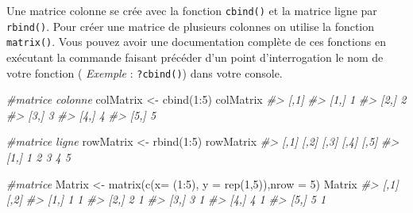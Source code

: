 \documentclass[
]{book}
\newenvironment{Shaded}{\begin{snugshade}}{\end{snugshade}}
\newcommand{\AttributeTok}[1]{\textcolor[rgb]{0.77,0.63,0.00}{#1}}
\newcommand{\CommentTok}[1]{\textcolor[rgb]{0.56,0.35,0.01}{\textit{#1}}}
\newcommand{\DecValTok}[1]{\textcolor[rgb]{0.00,0.00,0.81}{#1}}
\newcommand{\FunctionTok}[1]{\textcolor[rgb]{0.00,0.00,0.00}{#1}}
\newcommand{\NormalTok}[1]{#1}
\newcommand{\OtherTok}[1]{\textcolor[rgb]{0.56,0.35,0.01}{#1}}
\newcommand{\SpecialCharTok}[1]{\textcolor[rgb]{0.00,0.00,0.00}{#1}}
\begin{document}
Une matrice colonne se crée avec la fonction \texttt{cbind()} et la matrice ligne par \texttt{rbind()}. Pour créer une matrice de plusieurs colonnes on utilise la fonction \texttt{matrix()}.
Vous pouvez avoir une documentation complète de ces fonctions en exécutant la commande faisant précéder d'un point d'interrogation le nom de votre fonction ( \emph{Exemple} : \texttt{?cbind()}) dans votre console.

\begin{Shaded}
\begin{Highlighting}[]
\CommentTok{\#matrice colonne}
\NormalTok{colMatrix }\OtherTok{\textless{}{-}} \FunctionTok{cbind}\NormalTok{(}\DecValTok{1}\SpecialCharTok{:}\DecValTok{5}\NormalTok{)}
\NormalTok{colMatrix}
\CommentTok{\#\textgreater{}      [,1]}
\CommentTok{\#\textgreater{} [1,]    1}
\CommentTok{\#\textgreater{} [2,]    2}
\CommentTok{\#\textgreater{} [3,]    3}
\CommentTok{\#\textgreater{} [4,]    4}
\CommentTok{\#\textgreater{} [5,]    5}
\end{Highlighting}
\end{Shaded}

\begin{Shaded}
\begin{Highlighting}[]
\CommentTok{\#matrice ligne}
\NormalTok{rowMatrix }\OtherTok{\textless{}{-}} \FunctionTok{rbind}\NormalTok{(}\DecValTok{1}\SpecialCharTok{:}\DecValTok{5}\NormalTok{)}
\NormalTok{rowMatrix}
\CommentTok{\#\textgreater{}      [,1] [,2] [,3] [,4] [,5]}
\CommentTok{\#\textgreater{} [1,]    1    2    3    4    5}
\end{Highlighting}
\end{Shaded}

\begin{Shaded}
\begin{Highlighting}[]
\CommentTok{\#matrice}
\NormalTok{Matrix }\OtherTok{\textless{}{-}} \FunctionTok{matrix}\NormalTok{(}\FunctionTok{c}\NormalTok{(}\AttributeTok{x=}\NormalTok{ (}\DecValTok{1}\SpecialCharTok{:}\DecValTok{5}\NormalTok{), }\AttributeTok{y =} \FunctionTok{rep}\NormalTok{(}\DecValTok{1}\NormalTok{,}\DecValTok{5}\NormalTok{)),}\AttributeTok{nrow =} \DecValTok{5}\NormalTok{)}
\NormalTok{Matrix}
\CommentTok{\#\textgreater{}      [,1] [,2]}
\CommentTok{\#\textgreater{} [1,]    1    1}
\CommentTok{\#\textgreater{} [2,]    2    1}
\CommentTok{\#\textgreater{} [3,]    3    1}
\CommentTok{\#\textgreater{} [4,]    4    1}
\CommentTok{\#\textgreater{} [5,]    5    1}
\end{Highlighting}
\end{Shaded}
\end{document}
